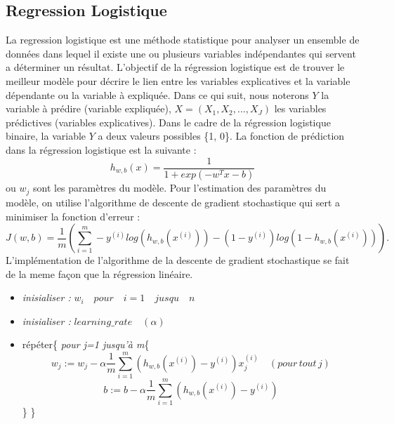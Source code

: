 \documentclass[a4paper,12pt]{article}
\begin{document}
\subsection{Regression Logistique}
La regression logistique est une méthode statistique pour analyser un ensemble de données dans lequel il existe une ou plusieurs variables indépendantes qui servent a déterminer un résultat.\newline
L'objectif de la régression logistique est de trouver le meilleur modèle pour décrire le lien entre les variables explicatives et la variable dépendante ou la variable  à expliquée.\newline
Dans ce qui suit, nous noterons $Y$ la variable à prédire (variable expliquée), $X = (X_1, X_2, ..., X_J)$ les variables prédictives (variables explicatives). \newline
Dans le cadre de la régression logistique binaire, la variable $Y$ a deux valeurs possibles \{1, 0\}.\newline
La fonction de prédiction dans la régression logistique est la suivante :\newline
$$h_{w,b}(x)=\dfrac{1}{1 + exp(-w^T x - b)}$$
ou $w_j$ sont les paramètres du modèle.\newline
Pour l'estimation des paramètres du modèle, on utilise l'algorithme de descente de gradient stochastique qui sert a minimiser la fonction d'erreur :\newline
$$J(w,b) = \dfrac{1}{m}(\sum_{i=1}^{m}-y^{(i)}log(h_{w,b}(x^{(i)}))-(1-y^{(i)})log(1 - h_{w,b}(x^{(i)}))).$$\newline 
L'implémentation de l'algorithme de la descente de gradient stochastique se fait de la meme façon que la régression linéaire.\newline
\begin{itemize}
\item{\textit{inisialiser :} $w_i\quad pour\quad i=1 \quad jusqu\quad n$}
\item{\textit{inisialiser : }$learning\_rate\quad(\alpha)$}

\item{répéter}\{\newline 
\hspace*{1cm}\textit{pour j=1 jusqu'à m}\{
$$w_j := w_j - \alpha  \dfrac{1}{m}\sum_{i = 1}^{m} (h_{w,b}(x^{(i)}) - y^{(i)})x_j^{(i)} \quad(pour\, tout \, j)$$
$$ b := b - \alpha  \dfrac{1}{m}\sum_{i = 1}^{m} (h_{w,b}(x^{(i)}) - y^{(i)})$$
\hspace*{1cm}\}\newline
\} 
\end{itemize}
\end{document}
